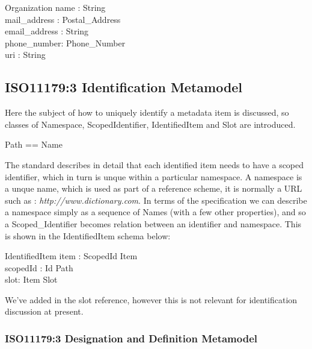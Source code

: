 \documentclass{llncs}
\begin{document}
\begin{class}{Organization}
\also
name : String \\
mail\_address : Postal\_Address \\
email\_address : String \\
phone\_number: Phone\_Number \\
uri : String\\
\end{class}




\subsection{ISO11179:3 Identification Metamodel }
Here the subject of how to uniquely identify a metadata item is discussed, so classes of Namespace, ScopedIdentifier, IdentifiedItem and Slot are introduced.

\begin{zed}
\end{zed}
\begin{zed}
  Path == \seq Name \\
\end{zed}


The standard describes in detail that each identified item needs to have a scoped identifier, which in turn is unque within a particular namespace. A namespace is a unque name, which is used as part of a reference scheme, it is normally a URL such as : \emph{http://www.dictionary.com}. In terms of the specification we can describe a namespace simply as a sequence of Names (with a few other properties), and so a Scoped\_Identifier becomes relation between an identifier and namespace. This is shown in the IdentifiedItem schema below: 


\begin{schema}{IdentifiedItem}
  item : ScopedId \pfun Item \\
  scopedId : Id \pfun Path \\
  slot: Item \pfun Slot
\end{schema}

We've added in the slot reference, however this is not relevant for identification discussion at present.

\subsubsection{ISO11179:3 Designation and Definition Metamodel}
\end{document}
